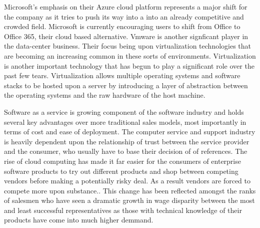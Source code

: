 Microsoft's emphasis on their Azure cloud platform represents a major shift for the company as it tries to push its way into a into an already competitive and crowded field.\autocite[]{OptimismInnovation}
Microsoft is currently encouraging users to shift from Office  to Office 365, their cloud based alternative.\autocite[]{NextGenBusinessSoftware}
Vmware is another signficant player in the data-center business. Their focus being upon virtualization technologies that are becoming an increasing common in these sorts of environments.\autocite[]{NextGenBusinessSoftware}
Virtualization is another important technology that has begun to play a significant role over the past few tears.\autocite[]{LargeParadigmShiftCloudComputing}
Virtualization allows multiple operating systems and software stacks to be hosted upon a server by introducing a layer of abstraction between the operating systems and the raw hardware of the host machine.\autocite[]{LargeParadigmShiftCloudComputing}

Software as a service is growing component of the software industry and holds several key advantages over more traditional sales models, most importantly in terms of cost and ease of deployment.\autocite[]{GrowthTrendsSoftwareService}\autocite[]{TransitionPhaseEnterpriseApplication}
The computer service and support industry is heavily dependent upon the relationship of trust between the service provider and the consumer, who usually have to base their decision of of references.\autocite[9]{buxmann2012software}
The rise of cloud computing has made it far easier for the consumers of enterprise software products to try out different products and shop between competing vendors before making a potentially risky deal.\autocite[29]{LiquidLunch}
As a result vendors are forced to compete more upon substance.\autocite[29]{LiquidLunch}. This change has been reflected amongst the ranks of salesmen who have seen a dramatic growth in wage disparity between the most and least successful representatives as those with technical knowledge of their products have come into much higher demmand.\autocite[30]{LiquidLunch}

